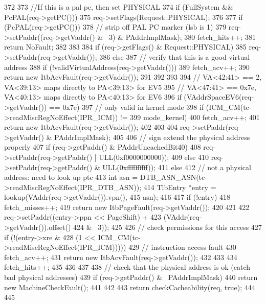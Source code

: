 \begin{DoxyCode}
372 {
373     //If this is a pal pc, then set PHYSICAL
374     if (FullSystem && PcPAL(req->getPC()))
375         req->setFlags(Request::PHYSICAL);
376 
377     if (PcPAL(req->getPC())) {
378         // strip off PAL PC marker (lsb is 1)
379         req->setPaddr((req->getVaddr() & ~3) & PAddrImplMask);
380         fetch_hits++;
381         return NoFault;
382     }
383 
384     if (req->getFlags() & Request::PHYSICAL) {
385         req->setPaddr(req->getVaddr());
386     } else {
387         // verify that this is a good virtual address
388         if (!validVirtualAddress(req->getVaddr())) {
389             fetch_acv++;
390             return new ItbAcvFault(req->getVaddr());
391         }
392 
393 
394         // VA<42:41> == 2, VA<39:13> maps directly to PA<39:13> for EV5
395         // VA<47:41> == 0x7e, VA<40:13> maps directly to PA<40:13> for EV6
396         if (VAddrSpaceEV6(req->getVaddr()) == 0x7e) {
397             // only valid in kernel mode
398             if (ICM_CM(tc->readMiscRegNoEffect(IPR_ICM)) !=
399                 mode_kernel) {
400                 fetch_acv++;
401                 return new ItbAcvFault(req->getVaddr());
402             }
403 
404             req->setPaddr(req->getVaddr() & PAddrImplMask);
405 
406             // sign extend the physical address properly
407             if (req->getPaddr() & PAddrUncachedBit40)
408                 req->setPaddr(req->getPaddr() | ULL(0xf0000000000));
409             else
410                 req->setPaddr(req->getPaddr() & ULL(0xffffffffff));
411         } else {
412             // not a physical address: need to look up pte
413             int asn = DTB_ASN_ASN(tc->readMiscRegNoEffect(IPR_DTB_ASN));
414             TlbEntry *entry = lookup(VAddr(req->getVaddr()).vpn(),
415                               asn);
416 
417             if (!entry) {
418                 fetch_misses++;
419                 return new ItbPageFault(req->getVaddr());
420             }
421 
422             req->setPaddr((entry->ppn << PageShift) +
423                           (VAddr(req->getVaddr()).offset()
424                            & ~3));
425 
426             // check permissions for this access
427             if (!(entry->xre &
428                   (1 << ICM_CM(tc->readMiscRegNoEffect(IPR_ICM))))) {
429                 // instruction access fault
430                 fetch_acv++;
431                 return new ItbAcvFault(req->getVaddr());
432             }
433 
434             fetch_hits++;
435         }
436     }
437 
438     // check that the physical address is ok (catch bad physical addresses)
439     if (req->getPaddr() & ~PAddrImplMask) {
440         return new MachineCheckFault();
441     }
442 
443     return checkCacheability(req, true);
444 
445 }
\end{DoxyCode}
